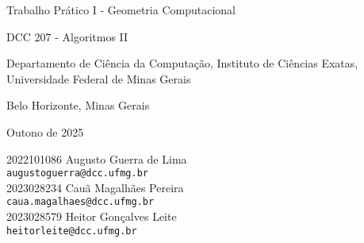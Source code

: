\documentclass{article}
\begin{document}
\begin{center}
    {
    \Large
    Trabalho Prático I - Geometria Computacional

    DCC 207 - Algoritmos II
    
    }

    Departamento de Ciência da Computação, Instituto de Ciências Exatas, Universidade Federal de Minas Gerais

    Belo Horizonte, Minas Gerais

    Outono de 2025
\end{center}

\begin{flushright}
2022101086  Augusto Guerra de Lima\\
\texttt{augustoguerra@dcc.ufmg.br}\\
2023028234  Cauã Magalhães Pereira\\
\texttt{caua.magalhaes@dcc.ufmg.br}\\
2023028579  Heitor Gonçalves Leite\\
\texttt{heitorleite@dcc.ufmg.br}\\

\end{flushright}
\vspace{1cm}
\end{document}
